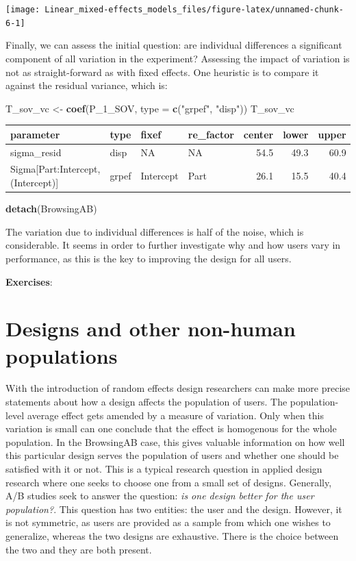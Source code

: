 \documentclass[]{svmono}
\newenvironment{Shaded}{\begin{snugshade}}{\end{snugshade}}
\newcommand{\KeywordTok}[1]{\textcolor[rgb]{0.13,0.29,0.53}{\textbf{#1}}}
\newcommand{\DataTypeTok}[1]{\textcolor[rgb]{0.13,0.29,0.53}{#1}}
\newcommand{\StringTok}[1]{\textcolor[rgb]{0.31,0.60,0.02}{#1}}
\newcommand{\NormalTok}[1]{#1}
\begin{document}
\texttt{[image: Linear\_mixed-effects\_models\_files/figure-latex/unnamed-chunk-6-1]}

Finally, we can assess the initial question: are individual differences
a significant component of all variation in the experiment? Assessing
the impact of variation is not as straight-forward as with fixed
effects. One heuristic is to compare it against the residual variance,
which is:

\begin{Shaded}
\begin{Highlighting}[]
\NormalTok{T_sov_vc <-}\StringTok{ }\KeywordTok{coef}\NormalTok{(P_1_SOV, }\DataTypeTok{type =} \KeywordTok{c}\NormalTok{(}\StringTok{"grpef"}\NormalTok{, }\StringTok{"disp"}\NormalTok{))}
\NormalTok{T_sov_vc}
\end{Highlighting}
\end{Shaded}

\begin{longtable}[]{@{}llllrrr@{}}
\toprule
parameter & type & fixef & re\_factor & center & lower &
upper\tabularnewline
\midrule
\endhead
sigma\_resid & disp & NA & NA & 54.5 & 49.3 & 60.9\tabularnewline
Sigma{[}Part:Intercept,(Intercept){]} & grpef & Intercept & Part & 26.1
& 15.5 & 40.4\tabularnewline
\bottomrule
\end{longtable}

\begin{Shaded}
\begin{Highlighting}[]
\KeywordTok{detach}\NormalTok{(BrowsingAB)}
\end{Highlighting}
\end{Shaded}

The variation due to individual differences is half of the noise, which
is considerable. It seems in order to further investigate why and how
users vary in performance, as this is the key to improving the design
for all users.

\textbf{Exercises}:

\section{Designs and other non-human
populations}\label{designs-and-other-non-human-populations}

With the introduction of random effects design researchers can make more
precise statements about how a design affects the population of users.
The population-level average effect gets amended by a measure of
variation. Only when this variation is small can one conclude that the
effect is homogenous for the whole population. In the BrowsingAB case,
this gives valuable information on how well this particular design
serves the population of users and whether one should be satisfied with
it or not. This is a typical research question in applied design
research where one seeks to choose one from a small set of designs.
Generally, A/B studies seek to answer the question: \emph{is one design
better for the user population?}. This question has two entities: the
user and the design. However, it is not symmetric, as users are provided
as a sample from which one wishes to generalize, whereas the two designs
are exhaustive. There is the choice between the two and they are both
present.
\end{document}
